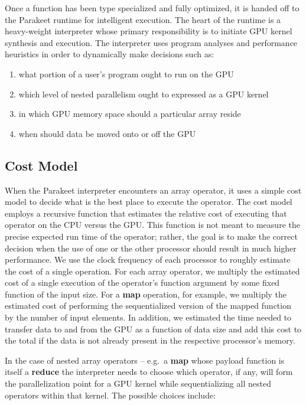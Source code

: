 \documentclass[10pt,twocolumn]{article}
\begin{document}
Once a function has been type specialized and fully optimized, it is handed off to the Parakeet runtime for intelligent execution. The heart of the runtime is a heavy-weight interpreter whose primary responsibility is to initiate GPU kernel synthesis and execution. The interpreter uses program analyses and performance heuristics in order to dynamically make decisions such as: 
\begin{enumerate}
\item what portion of a user's program ought to run on the GPU 
\item which level of nested parallelism ought to expressed as a GPU kernel
\item in which GPU memory space should a particular array reside 
\item when should data be moved onto or off the GPU
\end{enumerate} 

\subsection{Cost Model}
\label{costmodel}

When the Parakeet interpreter encounters an array operator, it uses a simple cost model to decide what is the best place to execute the operator.  The cost model employs a recursive function that estimates the relative cost of executing that operator on the CPU versus the GPU.  This function is not meant to measure the precise expected run time of the operator; rather, the goal is to make the correct decision when the use of one or the other processor should result in much higher performance.  We use the clock frequency of each processor to roughly estimate the cost of a single operation.  For each array operator, we multiply the estimated cost of a single execution of the operator's function argument by some fixed function of the input size.  For a \textbf{map} operation, for example, we multiply the estimated cost of performing the sequentialized version of the mapped function by the number of input elements. In addition, we estimated the time needed to transfer data to and from the GPU as a function of data size and add this cost to the total if the data is not already present in the respective processor's memory.

In the case of nested array operators -- e.g.~a \textbf{map} whose payload function is itself a \textbf{reduce} the interpreter needs to choose which operator, if any, will form the parallelization point for a GPU kernel while sequentializing all nested operators within that kernel.  The possible choices include:
\end{document}
